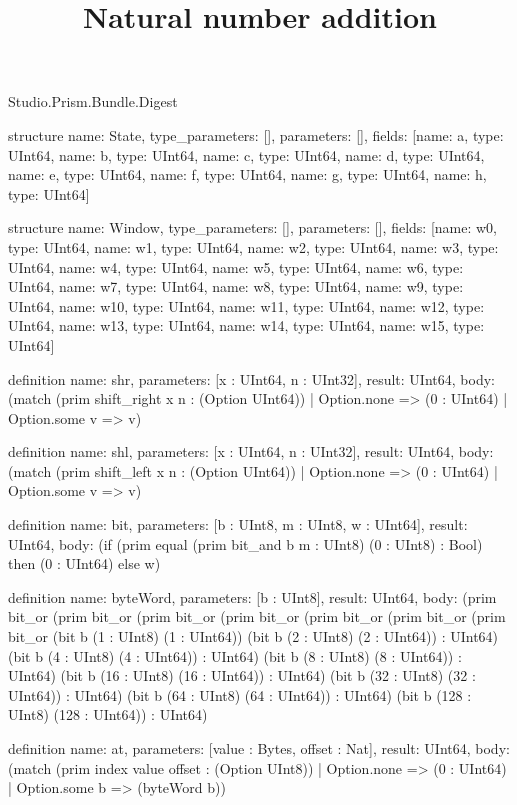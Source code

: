 \begin{lexlean}{Studio.Prism.Bundle.Digest}
\title{Natural number addition}
\begin{semanticmodule}
structure{
  name: State,
  type_parameters: [],
  parameters: [],
  fields: [{name: a, type: UInt64}, {name: b, type: UInt64}, {name: c, type: UInt64}, {name: d, type: UInt64}, {name: e, type: UInt64}, {name: f, type: UInt64}, {name: g, type: UInt64}, {name: h, type: UInt64}]
}

structure{
  name: Window,
  type_parameters: [],
  parameters: [],
  fields: [{name: w0, type: UInt64}, {name: w1, type: UInt64}, {name: w2, type: UInt64}, {name: w3, type: UInt64}, {name: w4, type: UInt64}, {name: w5, type: UInt64}, {name: w6, type: UInt64}, {name: w7, type: UInt64}, {name: w8, type: UInt64}, {name: w9, type: UInt64}, {name: w10, type: UInt64}, {name: w11, type: UInt64}, {name: w12, type: UInt64}, {name: w13, type: UInt64}, {name: w14, type: UInt64}, {name: w15, type: UInt64}]
}

definition{
  name: shr,
  parameters: [x : UInt64, n : UInt32],
  result: UInt64,
  body: (match (prim shift_right x n : (Option UInt64))
    | Option.none => (0 : UInt64)
    | Option.some v => v)
}

definition{
  name: shl,
  parameters: [x : UInt64, n : UInt32],
  result: UInt64,
  body: (match (prim shift_left x n : (Option UInt64))
    | Option.none => (0 : UInt64)
    | Option.some v => v)
}

definition{
  name: bit,
  parameters: [b : UInt8, m : UInt8, w : UInt64],
  result: UInt64,
  body: (if (prim equal (prim bit_and b m : UInt8) (0 : UInt8) : Bool) then (0 : UInt64) else w)
}

definition{
  name: byteWord,
  parameters: [b : UInt8],
  result: UInt64,
  body: (prim bit_or (prim bit_or (prim bit_or (prim bit_or (prim bit_or (prim bit_or (prim bit_or (bit b (1 : UInt8) (1 : UInt64)) (bit b (2 : UInt8) (2 : UInt64)) : UInt64) (bit b (4 : UInt8) (4 : UInt64)) : UInt64) (bit b (8 : UInt8) (8 : UInt64)) : UInt64) (bit b (16 : UInt8) (16 : UInt64)) : UInt64) (bit b (32 : UInt8) (32 : UInt64)) : UInt64) (bit b (64 : UInt8) (64 : UInt64)) : UInt64) (bit b (128 : UInt8) (128 : UInt64)) : UInt64)
}

definition{
  name: at,
  parameters: [value : Bytes, offset : Nat],
  result: UInt64,
  body: (match (prim index value offset : (Option UInt8))
    | Option.none => (0 : UInt64)
    | Option.some b => (byteWord b))
}


\end{semanticmodule}
\end{lexlean}
